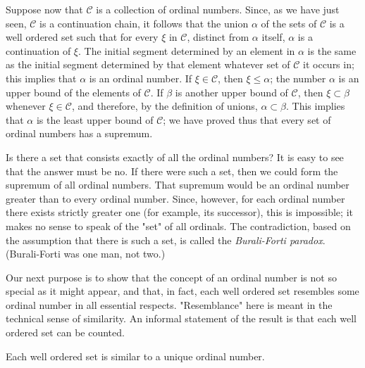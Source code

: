 Suppose now that $\mathcal{C}$ is a collection of ordinal numbers. Since, as we have just seen, $\mathcal{C}$ is a continuation chain, it follows that the union $\alpha$ of the sets of $\mathcal{C}$ is a well ordered set such that for every $\xi$ in $\mathcal{C}$, distinct from $\alpha$ itself, $\alpha$ is a continuation of $\xi$. The initial segment determined by an element in $\alpha$ is the same as the initial segment determined by that element whatever set of $\mathcal{C}$ it occurs in; this implies that $\alpha$ is an ordinal number. If $\xi \in \mathcal{C}$, then $\xi \le \alpha$; the number $\alpha$ is an upper bound of the elements of $\mathcal{C}$. If $\beta$ is another upper bound of $\mathcal{C}$, then $\xi \subset \beta$ whenever $\xi \in \mathcal{C}$, and therefore, by the definition of unions, $\alpha \subset \beta$. This implies that $\alpha$ is the least upper bound of $\mathcal{C}$; we have proved thus that every set of ordinal numbers has a supremum. 

Is there a set that consists exactly of all the ordinal numbers? It is easy to see that the answer must be no. If there were such a set, then we could form the supremum of all ordinal numbers. That supremum would be an ordinal number greater than to every ordinal number. Since, however, for each  ordinal number there exists strictly greater one (for example, its successor), this is impossible; it makes no sense to speak of the "set" of all ordinals. The contradiction, based on the assumption that there is such a set, is called the \textit{Burali-Forti paradox}. (Burali-Forti was one man, not two.) 

Our next purpose is to show that the concept of an ordinal number is not so special as it might appear, and that, in fact, each well ordered set resembles some ordinal number in all essential respects. "Resemblance" here is meant in the technical sense of similarity. An informal statement of the result is that each well ordered set can be counted. 

\begin{named} Each well ordered set is similar to a unique ordinal number.
\end{named}

